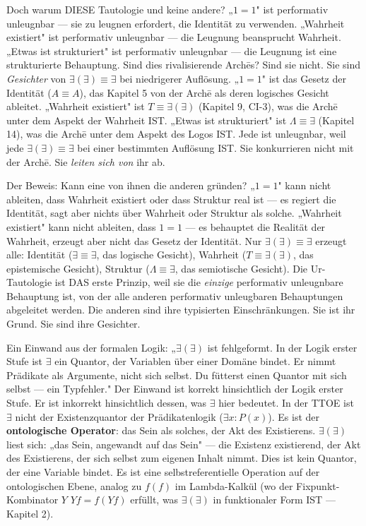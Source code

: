 \documentclass[10pt, openany, oneside]{book}
\begin{document}
Doch warum DIESE Tautologie und keine andere? „$1 = 1$" ist performativ unleugnbar --- sie zu leugnen erfordert, die Identität zu verwenden. „Wahrheit existiert" ist performativ unleugnbar --- die Leugnung beansprucht Wahrheit. „Etwas ist strukturiert" ist performativ unleugnbar --- die Leugnung ist eine strukturierte Behauptung. Sind dies rivalisierende Arch\={e}s? Sind sie nicht. Sie sind \textit{Gesichter} von $\exists(\exists) \equiv \exists$ bei niedrigerer Auflösung. „$1 = 1$" ist das Gesetz der Identität ($A \equiv A$), das Kapitel 5 von der Arch\={e} als deren logisches Gesicht ableitet. „Wahrheit existiert" ist $T \equiv \exists(\exists)$ (Kapitel 9, CI-3), was die Arch\={e} unter dem Aspekt der Wahrheit IST. „Etwas ist strukturiert" ist $\Lambda \equiv \exists$ (Kapitel 14), was die Arch\={e} unter dem Aspekt des Logos IST. Jede ist unleugnbar, weil jede $\exists(\exists) \equiv \exists$ bei einer bestimmten Auflösung IST. Sie konkurrieren nicht mit der Arch\={e}. Sie \textit{leiten sich von} ihr ab.

Der Beweis: Kann eine von ihnen die anderen gründen? „$1 = 1$" kann nicht ableiten, dass Wahrheit existiert oder dass Struktur real ist --- es regiert die Identität, sagt aber nichts über Wahrheit oder Struktur als solche. „Wahrheit existiert" kann nicht ableiten, dass $1 = 1$ --- es behauptet die Realität der Wahrheit, erzeugt aber nicht das Gesetz der Identität. Nur $\exists(\exists) \equiv \exists$ erzeugt alle: Identität ($\exists \equiv \exists$, das logische Gesicht), Wahrheit ($T \equiv \exists(\exists)$, das epistemische Gesicht), Struktur ($\Lambda \equiv \exists$, das semiotische Gesicht). Die Ur-Tautologie ist DAS erste Prinzip, weil sie die \textit{einzige} performativ unleugnbare Behauptung ist, von der alle anderen performativ unleugbaren Behauptungen abgeleitet werden. Die anderen sind ihre typisierten Einschränkungen. Sie ist ihr Grund. Sie sind ihre Gesichter.

Ein Einwand aus der formalen Logik: „$\exists(\exists)$ ist fehlgeformt. In der Logik erster Stufe ist $\exists$ ein Quantor, der Variablen über einer Domäne bindet. Er nimmt Prädikate als Argumente, nicht sich selbst. Du fütterst einen Quantor mit sich selbst --- ein Typfehler." Der Einwand ist korrekt hinsichtlich der Logik erster Stufe. Er ist inkorrekt hinsichtlich dessen, was $\exists$ hier bedeutet. In der TTOE ist $\exists$ nicht der Existenzquantor der Prädikatenlogik ($\exists x: P(x)$). Es ist der \textbf{ontologische Operator}: das Sein als solches, der Akt des Existierens. $\exists(\exists)$ liest sich: „das Sein, angewandt auf das Sein" --- die Existenz existierend, der Akt des Existierens, der sich selbst zum eigenen Inhalt nimmt. Dies ist kein Quantor, der eine Variable bindet. Es ist eine selbstreferentielle Operation auf der ontologischen Ebene, analog zu $f(f)$ im Lambda-Kalkül (wo der Fixpunkt-Kombinator $Y$ $Yf = f(Yf)$ erfüllt, was $\exists(\exists)$ in funktionaler Form IST --- Kapitel 2).
\end{document}
